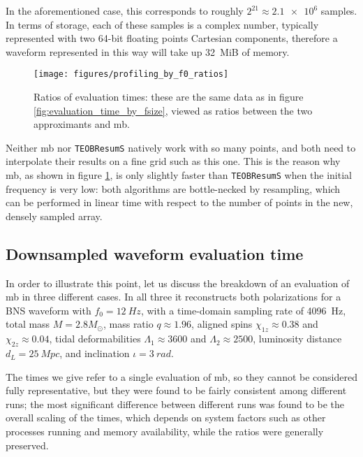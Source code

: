 \documentclass[main.tex]{subfiles}
\begin{document}
In the aforementioned case, this corresponds to roughly \(2^{21} \approx \num{2.1e6}\) samples. In terms of storage, each of these samples is a complex number, typically represented with two 64-bit floating points Cartesian components, therefore a waveform represented in this way will take up \SI{32}{MiB} of memory.

\begin{figure}[ht]
\centering
\texttt{[image: figures/profiling\_by\_f0\_ratios]}
\caption{Ratios of evaluation times: these are the same data as in figure \ref{fig:evaluation_time_by_fsize}, viewed as ratios between the two approximants and \ac{mb}. }
\label{fig:profiling_by_f0_ratios}
\end{figure}

Neither \ac{mb} nor \texttt{TEOBResumS} natively work with so many points, and both need to interpolate their results on a fine grid such as this one. 
This is the reason why \ac{mb}, as shown in figure \ref{fig:profiling_by_f0_ratios}, is only slightly faster than \texttt{TEOBResumS} when the initial frequency is very low: both algorithms are bottle-necked by resampling, which can be performed in linear time with respect to the number of points in the new, densely sampled array. 

\subsection{Downsampled waveform evaluation time} \label{sec:downsampled-evaluation}

In order to illustrate this point, let us discuss the breakdown of an evaluation of \ac{mb} in three different cases.
In all three it reconstructs both polarizations for a \ac{BNS} waveform with \(f_0 = \SI{12}{Hz}\), with a time-domain sampling rate of \SI{4096}{Hz}, total mass \(M = 2.8M_{\odot}\), mass ratio \(q \approx 1.96\), aligned spins \(\chi_{1z} \approx 0.38\) and \(\chi_{2z} \approx 0.04\), tidal deformabilities \(\Lambda_1 \approx 3600 \) and \(\Lambda_2 \approx 2500\), luminosity distance \(d_L = \SI{25}{Mpc}\), and inclination \(\iota = \SI{3}{rad}\).

The times we give refer to a single evaluation of \ac{mb}, so they cannot be considered fully representative, but they were found to be fairly consistent among different runs; the most significant difference between different runs was found to be the overall scaling of the times, which depends on system factors such as other processes running and memory availability, while the ratios were generally preserved.
\end{document}
